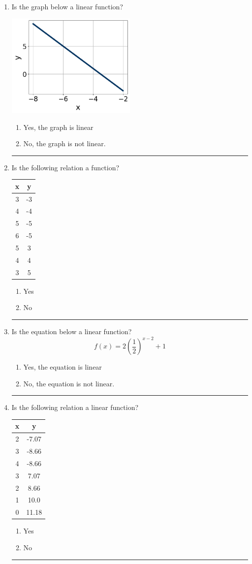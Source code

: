 \documentclass[14pt]{extbook}
\newcommand{\litem}[1]{\item#1\hspace*{-1cm}\rule{\textwidth}{0.4pt}}
\begin{document}
\begin{enumerate}
{\begin{enumerate}[label=\Alph*.]
\end{enumerate} }
\litem{
Is the graph below a linear function?
\begin{center}
    \includegraphics[width=0.5\textwidth]{../Figures/MA_8_F_1_2_graphE.png}
\end{center}
\begin{enumerate}[label=\Alph*.]
\item Yes, the graph is linear
\item No, the graph is not linear.

\end{enumerate} }
\litem{
Is the following relation a function?

\begin{tabular}{c|c}
x &y\tabularnewline \hline
3 &-3\tabularnewline \hline
4 &-4\tabularnewline \hline
5 &-5\tabularnewline \hline
6 &-5\tabularnewline \hline
5 &3\tabularnewline \hline
4 &4\tabularnewline \hline
3 &5\end{tabular}\begin{enumerate}[label=\Alph*.]
\item Yes
\item No

\end{enumerate} }
\litem{
Is the equation below a linear function?\[ f(x) = 2 \left( \dfrac{1}{2} \right)^{x -2}+1 \]\begin{enumerate}[label=\Alph*.]
\item Yes, the equation is linear
\item No, the equation is not linear.

\end{enumerate} }
\litem{
Is the following relation a linear function?

\begin{tabular}{c|c}
x &y\tabularnewline \hline
2 &-7.07\tabularnewline \hline
3 &-8.66\tabularnewline \hline
4 &-8.66\tabularnewline \hline
3 &7.07\tabularnewline \hline
2 &8.66\tabularnewline \hline
1 &10.0\tabularnewline \hline
0 &11.18\end{tabular}\begin{enumerate}[label=\Alph*.]
\item Yes
\item No


\end{enumerate}}
\end{enumerate}
\end{document}
